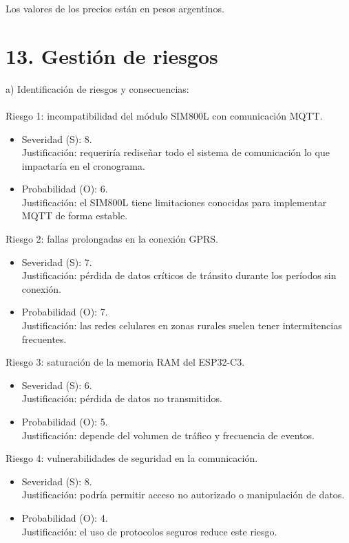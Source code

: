 \documentclass[
11pt, %
]{charter}
\begin{document}
Los valores de los precios están en pesos argentinos.


\section{13. Gestión de riesgos}

\label{sec:riesgos}

a) Identificación de riesgos y consecuencias: \\
\\
Riesgo 1: incompatibilidad del módulo SIM800L con comunicación MQTT.
\begin{itemize}
\item Severidad (S): 8.\\
Justificación: requeriría rediseñar todo el sistema de comunicación lo que impactaría en el cronograma.
\item Probabilidad (O): 6.\\
Justificación: el SIM800L tiene limitaciones conocidas para implementar MQTT de forma estable.
\end{itemize}

Riesgo 2: fallas prolongadas en la conexión GPRS.
\begin{itemize}
\item Severidad (S): 7.\\
Justificación: pérdida de datos críticos de tránsito durante los períodos sin conexión.
\item Probabilidad (O): 7.\\
Justificación: las redes celulares en zonas rurales suelen tener intermitencias frecuentes.
\end{itemize}

Riesgo 3: saturación de la memoria RAM del ESP32-C3.
\begin{itemize}
\item Severidad (S): 6.\\
Justificación: pérdida de datos no transmitidos.
\item Probabilidad (O): 5.\\
Justificación: depende del volumen de tráfico y frecuencia de eventos.
\end{itemize}

Riesgo 4: vulnerabilidades de seguridad en la comunicación.
\begin{itemize}
\item Severidad (S): 8.\\
Justificación: podría permitir acceso no autorizado o manipulación de datos.
\item Probabilidad (O): 4.\\
Justificación: el uso de protocolos seguros reduce este riesgo.
\end{itemize}
\end{document}
